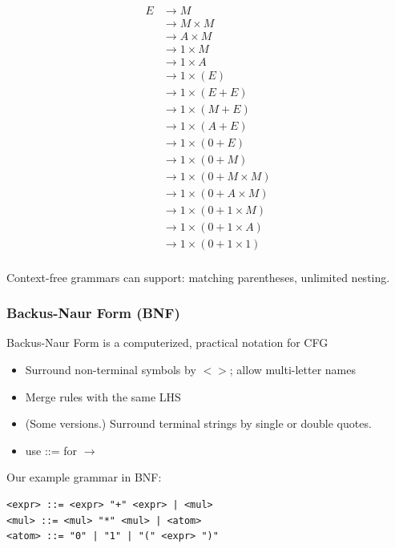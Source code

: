 \documentclass[12pt]{article}
\begin{document}
\begin{align*}
	E&\rightarrow M\\
	&\rightarrow M\times M\\
	&\rightarrow A\times M\\
	&\rightarrow 1\times M\\
	&\rightarrow 1\times A\\
	&\rightarrow 1\times (E)\\
	&\rightarrow 1\times (E+E)\\
	&\rightarrow 1\times (M+E)\\
	&\rightarrow 1\times (A+E)\\
	&\rightarrow 1\times (0+E)\\
	&\rightarrow 1\times (0+M)\\
	&\rightarrow 1\times (0+M\times M)\\
	&\rightarrow 1\times (0+A\times M)\\
	&\rightarrow 1\times (0+1\times M)\\
	&\rightarrow 1\times (0+1\times A)\\
	&\rightarrow 1\times (0+1\times 1)\\
\end{align*}

Context-free grammars can support: matching parentheses, unlimited nesting.

\subsubsection{Backus-Naur Form (BNF)}

Backus-Naur Form is a computerized, practical notation for CFG

\begin{itemize}
	\item{Surround non-terminal symbols by $<>$; allow multi-letter names}
	\item{Merge rules with the same LHS}
	\item{(Some versions.) Surround terminal strings by single or double quotes.}
	\item{use ::= for $\rightarrow$}
\end{itemize}

Our example grammar in BNF:

\begin{lstlisting}
<expr> ::= <expr> "+" <expr> | <mul>
<mul> ::= <mul> "*" <mul> | <atom>
<atom> ::= "0" | "1" | "(" <expr> ")"
\end{lstlisting}
\end{document}
